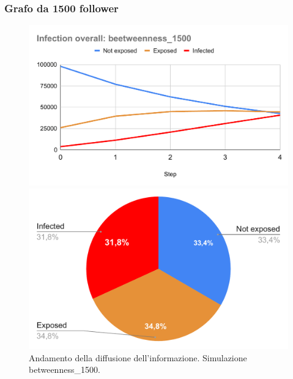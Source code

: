         \subsubsection{Grafo da 1500 follower}

           \begin{figure}[H]
                \centering
                \begin{minipage}[c]{0.55\textwidth}
                    \includegraphics[width=\textwidth]{resources/charts/Infection overall_ beetweenness_1500.pdf}
                \end{minipage}
                \hfill
                \begin{minipage}[c]{0.44\textwidth}
                    \includegraphics[width=\textwidth]{resources/charts/pie_btw_1500.pdf}
                \end{minipage}
                \caption{Andamento della diffusione dell'informazione. Simulazione betweenness\_1500.}
            \end{figure}
            
